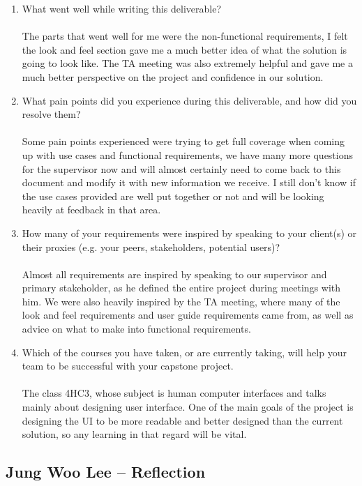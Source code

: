 \documentclass[12pt]{article}
\begin{document}
\begin{enumerate}
  \item What went well while writing this deliverable?\\\\
  The parts that went well for me were the non-functional requirements, I felt
  the look and feel section gave me a much better idea of what the solution is
  going to look like. The TA meeting was also extremely helpful and gave me a
  much better perspective on the project and confidence in our solution.
  \item What pain points did you experience during this deliverable, and how
  did you resolve them?\\\\
  Some pain points experienced were trying to get full coverage when coming up
  with use cases and functional requirements, we have many more questions for
  the supervisor now and will almost certainly need to come back to this
  document and modify it with new information we receive. I still don't know
  if the use cases provided are well put together or not and will be looking
  heavily at feedback in that area.
  \item How many of your requirements were inspired by speaking to your
  client(s) or their proxies (e.g. your peers, stakeholders, potential users)?
  \\\\
  Almost all requirements are inspired by speaking to our supervisor and
  primary stakeholder, as he defined the entire project during meetings with
  him. We were also heavily inspired by the TA meeting, where many of the
  look and feel requirements and user guide requirements came from, as well
  as advice on what to make into functional requirements.
  \item Which of the courses you have taken, or are currently taking, will help
  your team to be successful with your capstone project.\\\\
  The class 4HC3, whose subject is human computer interfaces and talks mainly
  about designing user interface. One of the main goals of the project is
  designing the UI to be more readable and better designed than the current
  solution, so any learning in that regard will be vital.

\end{enumerate}

\subsection*{Jung Woo Lee -- Reflection}
\end{document}

